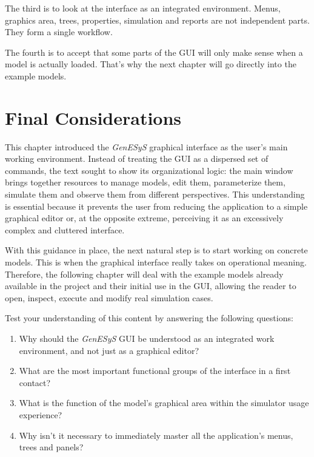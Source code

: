 The third is to look at the interface as an integrated environment. Menus, graphics area, trees, properties, simulation and reports are not independent parts. They form a single workflow.

The fourth is to accept that some parts of the GUI will only make sense when a model is actually loaded. That's why the next chapter will go directly into the example models.

\section{Final Considerations}
\label{sec:cap3_consideracoes_finais}

This chapter introduced the \textit{GenESyS} graphical interface as the user's main working environment. Instead of treating the GUI as a dispersed set of commands, the text sought to show its organizational logic: the main window brings together resources to manage models, edit them, parameterize them, simulate them and observe them from different perspectives. This understanding is essential because it prevents the user from reducing the application to a simple graphical editor or, at the opposite extreme, perceiving it as an excessively complex and cluttered interface.

With this guidance in place, the next natural step is to start working on concrete models. This is when the graphical interface really takes on operational meaning. Therefore, the following chapter will deal with the example models already available in the project and their initial use in the GUI, allowing the reader to open, inspect, execute and modify real simulation cases.

Test your understanding of this content by answering the following questions:

\begin{enumerate}
\item Why should the \textit{GenESyS} GUI be understood as an integrated work environment, and not just as a graphical editor?

\item What are the most important functional groups of the interface in a first contact?

\item What is the function of the model's graphical area within the simulator usage experience?

\item Why isn't it necessary to immediately master all the application's menus, trees and panels?
\end{enumerate}

